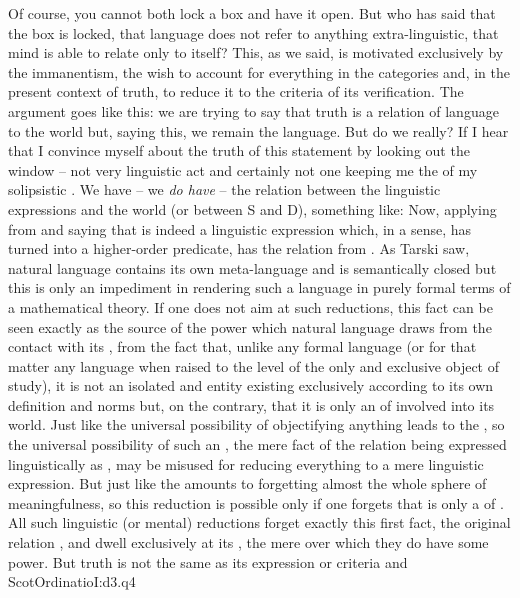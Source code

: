 Of course, you cannot both lock a box and have it open. But who has said that the
box is locked, that language does not refer to anything extra-linguistic, that
mind is able to relate only to itself? This, as we said, is motivated
exclusively by the immanentism, the wish to account for everything in the
 categories and, in the present context of truth, to reduce it to
the  criteria of its verification.  
The argument goes like this: we are trying to say that truth is a
relation of language to the world but, saying this, we remain  the
language. But do we really? If I hear that
I convince myself about the truth of this statement by looking
out the window -- not very linguistic act and certainly not one keeping me
 the  of my solipsistic .
We have -- we {\em do have} -- the relation between the linguistic expressions and
the world (or between S and D), something like:
%
Now, applying  from  and saying that
%
is indeed a linguistic expression which, in a sense, has turned 
into a higher-order predicate, has  the relation from
. As Tarski saw, natural language contains its own
meta-language and is semantically closed but this is only an impediment in
rendering such a language in purely formal terms of a mathematical theory. If
one does not aim at such reductions, this fact can be seen 
 exactly as the source of the power which  natural language 
draws from the contact with its , from the fact that, unlike any
formal language (or for that matter any language when raised to the level of the
only and exclusive object of study), it is not an isolated and 
entity existing exclusively according to its own definition and norms but, on the
contrary, that it is only an  of  involved into 
 its world.  Just like the universal possibility of {objectifying}
anything leads to the , so the universal possibility
of such an , the mere fact of the relation 
being expressed linguistically as , may be misused for reducing
everything to a mere linguistic expression.  But just like the  amounts to forgetting almost the whole sphere of 
meaningfulness, so this reduction is possible only if one forgets that
 is only a  of .  All such
linguistic (or mental) reductions forget exactly this first fact, the original
relation , and dwell exclusively at its 
, the mere  over which they do have some power. But
truth is not the same as its expression or criteria and \citet{the thing
  [statement] which is true can be know before its truth is
  known.}{ScotOrdinatio}{I:d3.q4}

